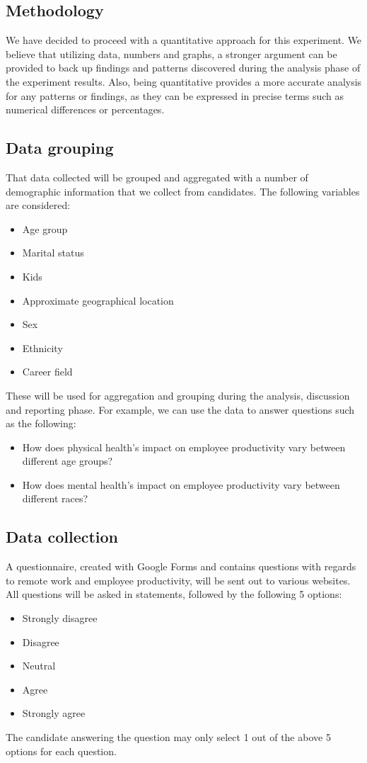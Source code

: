 \documentclass[12pt]{article}
\begin{document}
\subsection*{Methodology}
We have decided to proceed with a quantitative approach for this experiment. We believe that utilizing data, numbers and graphs, a stronger argument can be provided to back up findings and patterns discovered during the analysis phase of the experiment results. Also, being quantitative provides a more accurate analysis for any patterns or findings, as they can be expressed in precise terms such as numerical differences or percentages.

\subsection*{Data grouping}

That data collected will be grouped and aggregated with a number of demographic information that we collect from candidates. The following variables are considered:

\begin{itemize}
  \item Age group 
  \item Marital status
  \item Kids
  \item Approximate geographical location
  \item Sex
  \item Ethnicity
  \item Career field
\end{itemize}
These will be used for aggregation and grouping during the analysis, discussion and reporting phase. For example, we can use the data to answer questions such as the following:
\begin{itemize}
  \item How does physical health’s impact on employee productivity vary between different age groups?
  \item How does mental health’s impact on employee productivity vary between different races?
\end{itemize}

\subsection*{Data collection}

A questionnaire, created with Google Forms and contains questions with regards to remote work and employee productivity, will be sent out to various websites. \\
All questions will be asked in statements, followed by the following 5 options: 
\begin{itemize}
  \item Strongly disagree
  \item Disagree
  \item Neutral
  \item Agree
  \item Strongly agree
\end{itemize}
The candidate answering the question may only select 1 out of the above 5 options for each question. 
\end{document}
